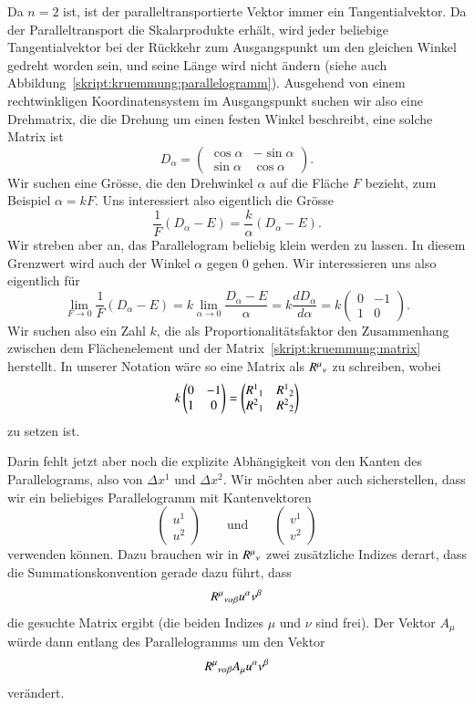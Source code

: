 Da $n=2$ ist, ist der paralleltransportierte Vektor immer ein
Tangentialvektor.
Da der Paralleltransport die Skalarprodukte erhält, wird jeder beliebige
Tangentialvektor bei der Rückkehr zum Ausgangspunkt um den gleichen
Winkel gedreht worden sein, und seine Länge wird nicht ändern
(siehe auch Abbildung~\ref{skript:kruemmung:parallelogramm}).
Ausgehend von einem rechtwinkligen Koordinatensystem im Ausgangspunkt
suchen wir also eine Drehmatrix, die die Drehung um einen festen Winkel
beschreibt, eine solche Matrix ist
\[
D_{\alpha}
=
\begin{pmatrix}
\cos\alpha&-\sin\alpha\\
\sin\alpha& \cos\alpha
\end{pmatrix}.
\]
Wir suchen eine Grösse, die den Drehwinkel $\alpha$ auf die
Fläche $F$ bezieht, zum Beispiel $\alpha=kF$.
Uns interessiert also eigentlich die Grösse
\[
\frac{1}{F}(D_{\alpha}-E)
=
\frac{k}{\alpha}(D_{\alpha}-E).
\]
Wir streben aber an, das Parallelogram beliebig klein werden zu lassen.
In diesem Grenzwert wird auch der Winkel $\alpha$ gegen $0$ gehen.
Wir interessieren uns also eigentlich für
\begin{equation}
\lim_{F\to 0}\frac{1}{F}(D_{\alpha}-E)
=
k \lim_{\alpha\to 0}
\frac{D_\alpha - E}{\alpha}
=
k \frac{dD_\alpha}{d\alpha}
=
k
\begin{pmatrix}
0&-1\\
1&0
\end{pmatrix}.
\label{skript:kruemmung:matrix}
\end{equation}
Wir suchen also ein Zahl $k$, die als Proportionalitätsfaktor den Zusammenhang
zwischen dem Flächen\-element und der Matrix~\eqref{skript:kruemmung:matrix}
herstellt.
In unserer Notation wäre so eine Matrix als $R^\mu\mathstrut_\nu$ zu
schreiben, wobei
\[
k
\begin{pmatrix}
0&-1\\
1&0
\end{pmatrix}
=
\begin{pmatrix}
R^1\mathstrut_1&R^1\mathstrut_2\\
R^2\mathstrut_1&R^2\mathstrut_2
\end{pmatrix}
\]
zu setzen ist.

Darin fehlt jetzt aber noch die explizite Abhängigkeit von den Kanten
des Parallelograms, also von $\Delta x^1$ und $\Delta x^2$.
Wir möchten aber auch sicherstellen, dass wir ein beliebiges Parallelogramm
mit Kantenvektoren
\[
\begin{pmatrix}u^1\\u^2\end{pmatrix}
\qquad\text{und}\qquad
\begin{pmatrix}v^1\\v^2\end{pmatrix}
\]
verwenden können.
Dazu brauchen wir in $R^\mu\mathstrut_\nu$ zwei zusätzliche Indizes
derart, dass die Summationskonvention gerade dazu führt, dass
\[
R^\mu\mathstrut_{\nu\alpha\beta}u^\alpha v^\beta
\]
die gesuchte Matrix ergibt (die beiden Indizes $\mu$ und $\nu$ sind frei).
Der Vektor $A_\mu$ würde dann entlang des Parallelogramms um den
Vektor
\[
R^\mu\mathstrut_{\nu\alpha\beta} A_\mu u^\alpha v^\beta
\]
verändert.


